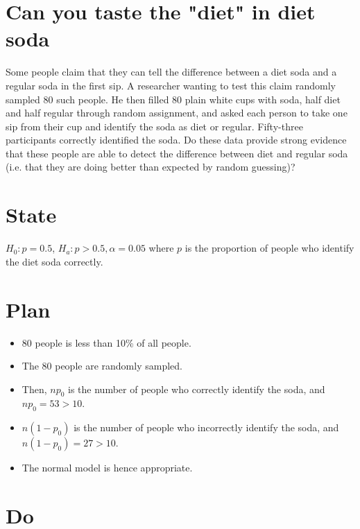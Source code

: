 \documentclass{scrreprt} %
\begin{document}
\section{Can you taste the "diet" in diet soda}

Some people claim that they can tell the difference between a diet soda and a regular soda in the
first sip. A researcher wanting to test this claim randomly sampled 80 such people. He then filled
80 plain white cups with soda, half diet and half regular through random assignment, and asked
each person to take one sip from their cup and identify the soda as diet or regular. Fifty-three
participants correctly identified the soda. Do these data provide strong evidence that these people
are able to detect the difference between diet and regular soda (i.e. that they are doing better
than expected by random guessing)?

\newpage

\section{State}


$H_0: p = 0.5$, $H_a: p > 0.5, \alpha = 0.05$
where $p$ is the proportion of people who identify the diet soda correctly.

\newpage

\section{Plan}

\begin{itemize}
	\item 80 people is less than 10\% of all people.
	\item The 80 people are randomly sampled.
	\item Then, $np_0$ is the number of people who correctly identify
	the soda, and $np_0 = 53 > 10$.
	\item $n(1-p_0)$ is the number of people who incorrectly identify the
	soda, and $n(1-p_0)= 27 > 10$.
	\item The normal model is hence appropriate.
\end{itemize}

\section{Do}
\end{document}
